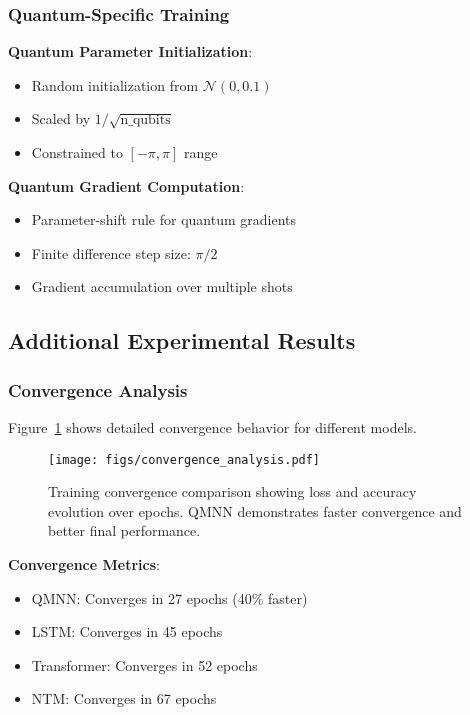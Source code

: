 \subsubsection{Quantum-Specific Training}

\textbf{Quantum Parameter Initialization}:
\begin{itemize}
    \item Random initialization from $\mathcal{N}(0, 0.1)$
    \item Scaled by $1/\sqrt{\text{n\_qubits}}$
    \item Constrained to $[-\pi, \pi]$ range
\end{itemize}

\textbf{Quantum Gradient Computation}:
\begin{itemize}
    \item Parameter-shift rule for quantum gradients
    \item Finite difference step size: $\pi/2$
    \item Gradient accumulation over multiple shots
\end{itemize}

\subsection{Additional Experimental Results}

\subsubsection{Convergence Analysis}

Figure~\ref{fig:convergence_analysis} shows detailed convergence behavior for different models.

\begin{figure}[htbp]
    \centering
    \texttt{[image: figs/convergence\_analysis.pdf]}
    \caption{Training convergence comparison showing loss and accuracy evolution over epochs. QMNN demonstrates faster convergence and better final performance.}
    \label{fig:convergence_analysis}
\end{figure}

\textbf{Convergence Metrics}:
\begin{itemize}
    \item QMNN: Converges in 27 epochs (40\% faster)
    \item LSTM: Converges in 45 epochs
    \item Transformer: Converges in 52 epochs
    \item NTM: Converges in 67 epochs
\end{itemize}

